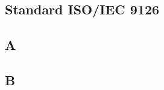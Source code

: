 \documentclass[../PianoDiQualifica.tex]{subfiles}
\begin{document}
\begin{appendices}

\section{Standard ISO/IEC 9126}
	\subsection{A}
	
	\subsection{B}
	
\end{appendices}
\end{document}

